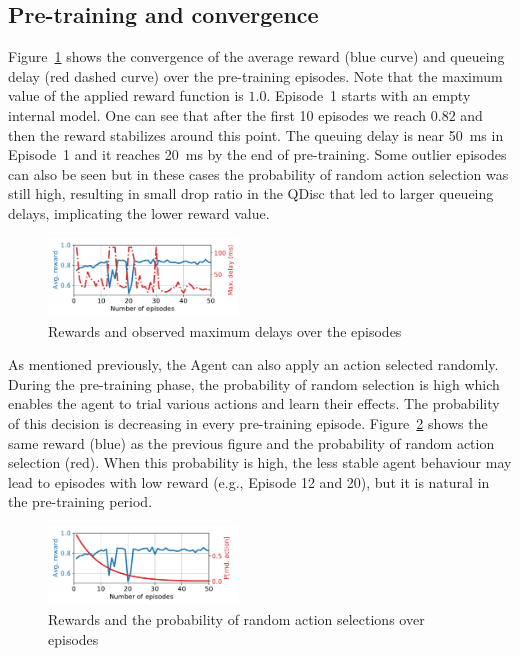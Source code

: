 \documentclass[conference]{IEEEtran}
\begin{document}
\subsection{Pre-training and convergence}
Figure~\ref{fig:reward_delay} shows the convergence of the average reward (blue curve) and queueing delay (red dashed curve) over the pre-training episodes. Note that the maximum value of the applied reward function is $1.0$. Episode~1 starts with an empty internal model.  One can see that after the first 10 episodes we reach $0.82$ and then the reward stabilizes around this point. The queuing delay is near 50~ms in Episode~1 and it reaches 20~ms by the end of pre-training. Some outlier episodes can also be seen but in these cases the probability of random action selection was still high, resulting in small drop ratio in the QDisc that led to larger queueing delays, implicating the lower reward value.

\begin{figure}[b]
\begin{center}
\includegraphics[width=0.45\textwidth]{Figures/reward_delay.pdf}
\end{center}
\caption{Rewards and observed maximum delays over the episodes}
\label{fig:reward_delay}
\end{figure}

As mentioned previously, the Agent can also apply an action selected randomly. During the pre-training phase, the probability of random selection is high which enables the agent to trial various actions and learn their effects.  The probability of this decision is decreasing in every pre-training episode. Figure~\ref{fig:reward_epsolon} shows the same reward (blue) as the previous figure and the probability of random action selection (red). When this probability is high, the less stable agent behaviour may lead to episodes with low reward (e.g., Episode 12 and 20), but it is natural in the pre-training period. 

\begin{figure}[b]
\begin{center}
\includegraphics[width=0.45\textwidth]{Figures/reward_epsilon.pdf}
\end{center}
\caption{Rewards and the probability of random action selections over episodes}
\label{fig:reward_epsolon}
\end{figure}
\end{document}
